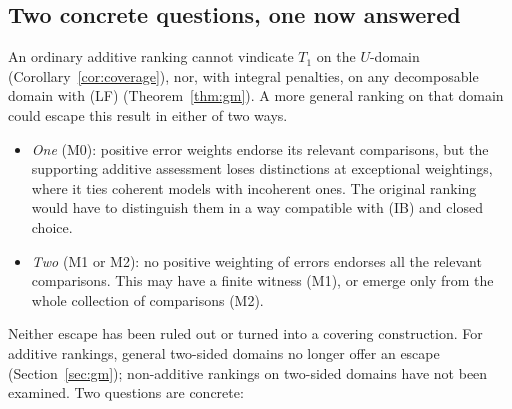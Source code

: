 \documentclass[11pt]{article}
\theoremstyle{definition}
\theoremstyle{remark}
\begin{document}
\subsection{Two concrete questions, one now answered}\label{sec:two-questions}
An ordinary additive ranking cannot vindicate $T_1$ on the $U$-domain (Corollary~\ref{cor:coverage}), nor, with integral penalties, on any decomposable domain with (LF) (Theorem~\ref{thm:gm}). A more general ranking on that domain could escape this result in either of two ways.
\begin{itemize}[leftmargin=*]
\item \emph{One} (M0): positive error weights endorse its relevant comparisons, but the supporting additive assessment loses distinctions at exceptional weightings, where it ties coherent models with incoherent ones. The original ranking would have to distinguish them in a way compatible with (IB) and closed choice.
\item \emph{Two} (M1 or M2): no positive weighting of errors endorses all the relevant comparisons. This may have a finite witness (M1), or emerge only from the whole collection of comparisons (M2).
\end{itemize}
Neither escape has been ruled out or turned into a covering construction. For additive rankings, general two-sided domains no longer offer an escape (Section~\ref{sec:gm}); non-additive rankings on two-sided domains have not been examined. Two questions are concrete:
\end{document}
